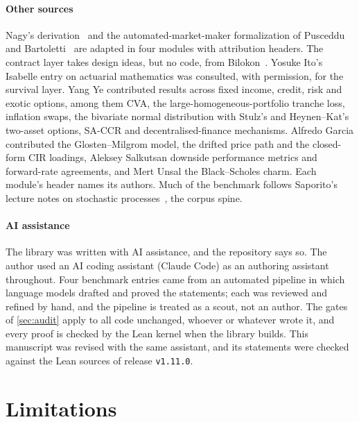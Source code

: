 \documentclass[11pt]{article}
\begin{document}
\paragraph{Other sources}
Nagy's derivation~\cite{Nagy2026} and the automated-market-maker formalization of Pusceddu and Bartoletti~\cite{PuscedduBartoletti2024}
are adapted in four modules with attribution headers. The contract layer takes design ideas, but no code, from
Bilokon~\cite{Bilokon2026}. Yosuke Ito's Isabelle entry on actuarial mathematics was consulted, with permission, for the survival
layer. Yang Ye contributed results across fixed income, credit, risk and exotic options, among them CVA, the
large-homogeneous-portfolio tranche loss, inflation swaps, the bivariate normal distribution with Stulz's and Heynen--Kat's
two-asset options, SA-CCR and decentralised-finance mechanisms. Alfredo Garcia contributed the Glosten--Milgrom model, the drifted
price path and the closed-form CIR loadings, Aleksey Salkutsan downside performance metrics and forward-rate agreements, and Mert
Unsal the Black--Scholes charm. Each module's header names its authors. Much of the benchmark follows Saporito's lecture notes on
stochastic processes~\cite{Saporito}, the corpus spine.

\paragraph{AI assistance}
The library was written with AI assistance, and the repository says so. The author used an AI coding assistant (Claude Code) as an
authoring assistant throughout. Four benchmark entries came from an automated pipeline in which language models drafted and proved the
statements; each was reviewed and refined by hand, and the pipeline is treated as a scout, not an author. The gates of
\cref{sec:audit} apply to all code unchanged, whoever or whatever wrote it, and every proof is checked by the Lean kernel when the
library builds.
This manuscript was revised with the same assistant, and its statements were checked against the Lean sources of release
\texttt{v1.11.0}.

\section{Limitations}\label{sec:limitations}
\end{document}
